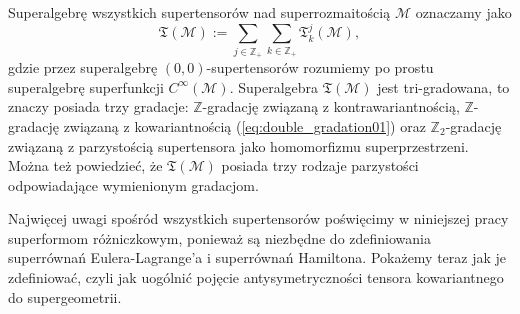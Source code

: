 \documentclass[11pt,a4paper]{report}
\theoremstyle{definition}
\begin{document}
Superalgebrę wszystkich supertensorów nad superrozmaitością $\mathcal{M}$ oznaczamy jako
\begin{equation}
	\label{eq:double_gradation01}
	\mathfrak{T}(\mathcal{M}) := \sum_{j \in \mathbb{Z}_+} \sum_{k \in \mathbb{Z}_+} \mathfrak T^j_k(\mathcal{M}),
\end{equation}
gdzie przez superalgebrę $(0,0)$-supertensorów rozumiemy po prostu superalgebrę superfunkcji $C^\infty(\mathcal{M})$. Superalgebra $\mathfrak{T}(\mathcal{M})$ jest tri-gradowana, to znaczy posiada trzy gradacje: $\mathbb{Z}$-gradację związaną z kontrawariantnością, $\mathbb{Z}$-gradację związaną z kowariantnością (\ref{eq:double_gradation01}) oraz $\mathbb{Z}_2$-gradację związaną z parzystością supertensora jako homomorfizmu superprzestrzeni. Można też powiedzieć, że $\mathfrak{T}(\mathcal{M})$ posiada trzy rodzaje parzystości odpowiadające wymienionym gradacjom.
		      			
Najwięcej uwagi spośród wszystkich supertensorów poświęcimy w niniejszej pracy superformom różniczkowym, ponieważ są niezbędne do zdefiniowania superrównań Eulera-Lagrange'a i superrównań Hamiltona. Pokażemy teraz jak je zdefiniować, czyli jak uogólnić pojęcie antysymetryczności tensora kowariantnego do supergeometrii.
		      			
\end{document}
